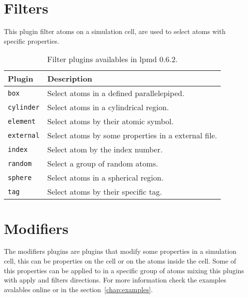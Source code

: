 \section{Filters}
This plugin filter atoms on a simulation cell, are used to select atoms with
specific properties.

\begin{table}[h!]\centering
 \begin{tabular}{|l|p{13cm}|}\hline
 Plugin & Description \\
 \hline\hline
 \texttt{box} & Select atoms in a defined parallelepiped.\\
 \hline
 \texttt{cylinder} & Select atoms in a cylindrical region.\\
 \hline
 \texttt{element} & Select atoms by their atomic symbol.\\
 \hline
 \texttt{external} & Select atoms by some properties in a external file.\\
 \hline
 \texttt{index} & Select atom by the index number.\\
 \hline
 \texttt{random} & Select a group of random atoms.\\
 \hline
 \texttt{sphere} & Select atoms in a spherical region.\\
 \hline
 \texttt{tag} & Select atoms by their specific tag.\\
 \hline
 \end{tabular}
\label{tab:filtros}
\caption{Filter plugins availables in lpmd 0.6.2.}
\end{table}


\section{Modifiers}
The modifiers plugins are plugins that modify some properties in a simulation
cell, this can be properties on the cell or on the atoms inside the cell. Some
of this properties can be applied to in a specific group of atoms mixing this
plugins with apply and filters directions. For more information check the
examples avalables online or in the section~\ref{chap:examples}.

